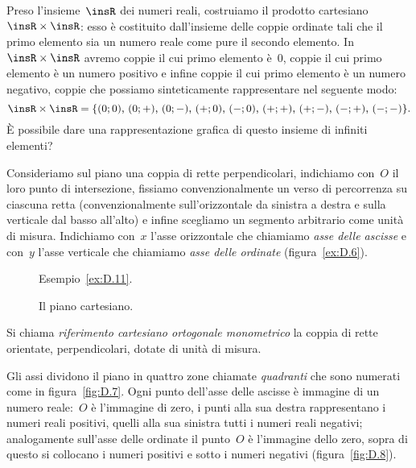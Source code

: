 Preso l'insieme~$\insR$ dei numeri reali, costruiamo il prodotto cartesiano~$\insR\times \insR$: esso è costituito dall'insieme delle coppie
ordinate tali che il primo elemento sia un numero reale come pure il secondo elemento. In~$\insR\times \insR$ avremo coppie il cui primo
elemento è~$0$, coppie il cui primo elemento è un numero positivo e infine coppie il cui primo elemento è un numero negativo,
coppie che possiamo sinteticamente rappresentare nel seguente modo:
\begin{equation*}
\insR\times \insR=\{(0;0)\text{, }(0;+)\text{, }(0;-)\text{, }(+;0)\text{, }(-;0)\text{, }(+;+)\text{, }(+;-)\text{, }(-;+)\text{, }(-;-)\}.
\end{equation*}
\`E possibile dare una rappresentazione grafica di questo insieme di infiniti elementi?

Consideriamo sul piano una coppia di rette perpendicolari, indichiamo con~$O$ il loro punto di intersezione,
fissiamo convenzionalmente un verso di percorrenza su ciascuna retta (convenzionalmente sull'orizzontale da
sinistra a destra e sulla verticale dal basso all'alto) e infine scegliamo un segmento arbitrario come unità di misura.
Indichiamo con~$x$ l'asse orizzontale che chiamiamo \emph{asse delle ascisse} e con~$y$ l'asse verticale che chiamiamo \emph{asse delle ordinate} (figura~\ref{ex:D.6}).

\begin{figure}[htb]
 \begin{minipage}[t]{.45\textwidth}
 \centering
 \caption{Esempio~\ref{ex:D.11}.}\label{fig:D.5}
 \end{minipage}\hfil
 \begin{minipage}[t]{.45\textwidth}
 \centering
 \caption{Il piano cartesiano.}\label{fig:D.6}
 \end{minipage}
\end{figure}

\begin{definizione}
Si chiama \emph{riferimento cartesiano ortogonale monometrico} la coppia di rette orientate, perpendicolari, dotate di unità di misura.
\end{definizione}

Gli assi dividono il piano in quattro zone chiamate \emph{quadranti} che sono numerati come in figura~\ref{fig:D.7}.
Ogni punto dell'asse delle ascisse è immagine di un numero reale:~$O$ è l'immagine di zero,
i punti alla sua destra rappresentano i numeri reali positivi, quelli alla sua sinistra tutti i numeri
reali negativi; analogamente sull'asse delle ordinate il punto~$O$ è l'immagine dello zero, sopra di questo si collocano i numeri
positivi e sotto i numeri negativi (figura~\ref{fig:D.8}).

